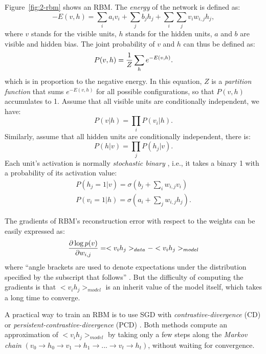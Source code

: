 Figure~\ref{fig:2-rbm} shows an RBM. The {\it energy} of the network is defined as:
\begin{equation}
-E(v,h) = \sum_i a_iv_i + \sum_j b_jh_j + \sum_i\sum_j v_iw_{i,j}h_j,
\end{equation}
where $v$ stands for the visible units, $h$ stands for the hidden units, $a$ and $b$ are visible and hidden bias. The joint probability of $v$ and $h$ can thus be defined as:
\begin{equation}
P(v,h) = {1\over Z} \sum_h e^{-E(v,h)}.
\end{equation}
which is in proportion to the negative energy. In this equation, $Z$ is a {\it partition function} that sums $e^{-E(v,h)}$ for all possible configurations, so that $P(v,h)$ accumulates to 1. Assume that all visible units are conditionally independent, we have:
\begin{equation}
P(v|h) = \prod_i P(v_i|h).
\end{equation}
Similarly, assume that all hidden units are conditionally independent, there is:
\begin{equation}
P(h|v) = \prod_j P(h_j|v).
\end{equation}
Each unit's activation is normally {\it stochastic binary} \cite{hinton2010practical}, i.e., it takes a binary 1 with a probability of its activation value:
\begin{equation}
\begin{split}
P(h_j=1|v) = \sigma(b_j+\sum_i w_{i,j}v_i) \\
P(v_i=1|h) = \sigma(a_i+\sum_j w_{i,j}h_j).
\end{split}
\end{equation}

The gradients of RBM's reconstruction error with respect to the weights can be easily expressed as:
\begin{equation}
{\partial \log p(v) \over \partial w_{i,j}} = <v_ih_j>_{data} - <v_ih_j>_{model}
\end{equation}
where ``angle brackets are used to denote expectations under the distribution specified by the subscript that follows'' \cite{hinton2010practical}. But the difficulty of computing the gradients is that $<v_ih_j>_{model}$ is an inherit value of the model itself, which takes a long time to converge.

A practical way to train an RBM is to use SGD with {\it contrastive-divergence} \cite{hinton2010practical} (CD) or {\it persistent-contrastive-divergence} (PCD) \cite{tieleman2008training}. Both methods compute an approximation of $<v_ih_j>_{model}$ by taking only a few steps along the {\it Markov chain} $(v_0\rightarrow h_0\rightarrow v_1\rightarrow h_1\rightarrow...\rightarrow v_t\rightarrow h_t)$, without waiting for convergence.

